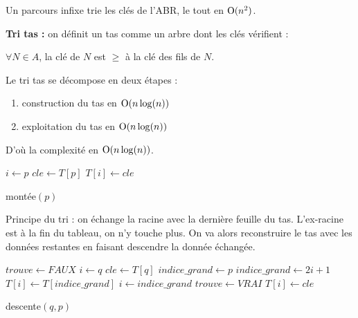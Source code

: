 \documentclass[a4paper, 8pt]{article}
\begin{document}
\begin{multicols*}{3}
Un parcours infixe trie les clés de l'ABR, le tout en $\text{O}(n^2)$.

\medskip
\textbf{Tri tas :} on définit un tas comme un arbre dont les clés vérifient :
\begin{changemargin}{0.5cm}{0.5cm} 
\begin{center}
$\forall N\in A$, la clé de $N$ est $\geqslant$ à la clé des fils de $N$.
\end{center}
\end{changemargin}

Le tri tas se décompose en deux étapes :
\begin{enumerate}
\item construction du tas en $\text{O}(n\log(n))$
\item exploitation du tas en $\text{O}(n\log(n))$
\end{enumerate}

D'où la complexité en $\text{O}(n\log(n))$.

\begin{algorithm}[H]
  $i \longleftarrow p$ \;
  $cle \longleftarrow T\left[p\right]$ \;
  	$T\left[i\right] \longleftarrow cle$ \;
 \caption{montée$(p)$}
\end{algorithm}

Principe du tri : on échange la racine avec la dernière feuille du tas. L'ex-racine est à la fin du tableau, on n'y touche plus. On va alors reconstruire le tas avec les données restantes en faisant descendre la donnée échangée.

\newcommand{\ig}{indice\_ grand}
\begin{algorithm}[H]
  $trouve \longleftarrow FAUX$ \;
  $i \longleftarrow q$ \;
  $cle \longleftarrow T\left[q\right]$ \;
  {
  	{$\ig \longleftarrow p$}{
  		{
  			$\ig \longleftarrow 2i+1$~\;
  		}
  	}
  	\eIf{$cle < T\left[\ig\right]$}
  	{
  		$T\left[i\right] \longleftarrow T\left[ \ig \right]$ \;
  		$i \longleftarrow \ig$ \;
  	}{
  	$trouve \longleftarrow VRAI$ \;
  	}
  }
  $T\left[i\right] \longleftarrow cle$ \;
 \caption{descente$(q,p)$}
\end{algorithm}


\end{multicols*}
\end{document}
